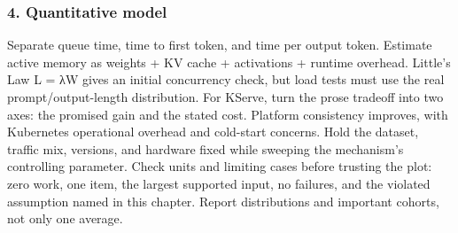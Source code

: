 \subsubsection*{4. Quantitative model}
Separate queue time, time to first token, and time per output token. Estimate active memory as weights + KV cache + activations + runtime overhead. Little's Law L = λW gives an initial concurrency check, but load tests must use the real prompt/output-length distribution.
For KServe, turn the prose tradeoff into two axes: the promised gain and the stated cost. Platform consistency improves, with Kubernetes operational overhead and cold-start concerns. Hold the dataset, traffic mix, versions, and hardware fixed while sweeping the mechanism's controlling parameter.
Check units and limiting cases before trusting the plot: zero work, one item, the largest supported input, no failures, and the violated assumption named in this chapter. Report distributions and important cohorts, not only one average.
